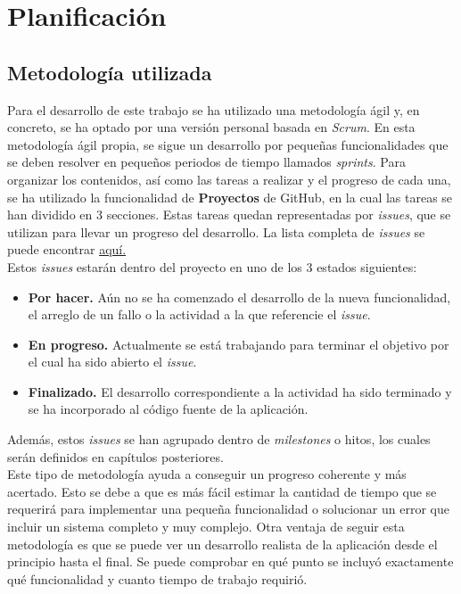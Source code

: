\chapter{Planificación}
\section{Metodología utilizada}

Para el desarrollo de este trabajo se ha utilizado una metodología ágil y, en concreto, se ha optado por una versión personal basada en \textit{Scrum}\cite{scrum}. En esta metodología
ágil propia, se sigue un desarrollo por pequeñas funcionalidades que se deben resolver en pequeños periodos de tiempo llamados \textit{sprints}. Para organizar los contenidos, así como las tareas
a realizar y el progreso de cada una, se ha utilizado la funcionalidad de \textbf{Proyectos} de GitHub, en la cual las tareas se han dividido en 3 secciones. Estas tareas
quedan representadas por \textit{issues}, que se utilizan para llevar un progreso del desarrollo. La lista completa de \textit{issues} se puede encontrar \href{https://github.com/Cerv1/Chief/issues?q=is\%3Aissue+is\%3Aclosed}{aquí.} \\

Estos \textit{issues} estarán dentro del proyecto en uno de los 3 estados siguientes:

\begin{itemize}
	\item \textbf{Por hacer.} Aún no se ha comenzado el desarrollo de la nueva funcionalidad, el arreglo de un fallo o la actividad a la que referencie el \textit{issue}.
	\item \textbf{En progreso.} Actualmente se está trabajando para terminar el objetivo por el cual ha sido abierto el \textit{issue}.
	\item \textbf{Finalizado. } El desarrollo correspondiente a la actividad ha sido terminado y se ha incorporado al código fuente de la aplicación.
\end{itemize}

Además, estos \textit{issues} se han agrupado dentro de \textit{milestones} o hitos, los cuales serán definidos en capítulos posteriores.\\

Este tipo de metodología ayuda a conseguir un progreso coherente y más acertado. Esto se debe a que es más fácil estimar la cantidad de tiempo que se requerirá para
implementar una pequeña funcionalidad o solucionar un error que incluir un sistema completo y muy complejo. Otra ventaja de seguir esta metodología es que se puede ver
un desarrollo realista de la aplicación desde el principio hasta el final. Se puede comprobar en qué punto se incluyó exactamente qué funcionalidad y cuanto tiempo de 
trabajo requirió. 

